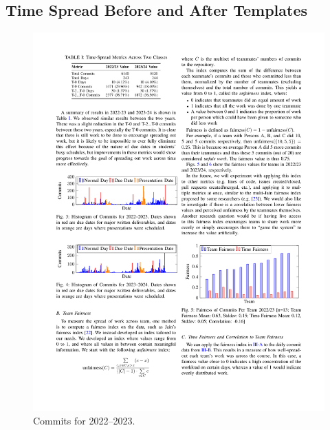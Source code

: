 \documentclass[poster, a1, plainboxedsections]{sciposter}
\begin{document}
\begin{multicols}{2}

\section{Time Spread Before and After Templates}

\begin{figure}[h!]
\centering
\includegraphics[width=0.9\linewidth]{../figures/HistCommits2022-23.pdf}
\caption{Commits for 2022--2023.}\label{Fig_22_23Timeline}
\end{figure}


\end{multicols}
\end{document}
